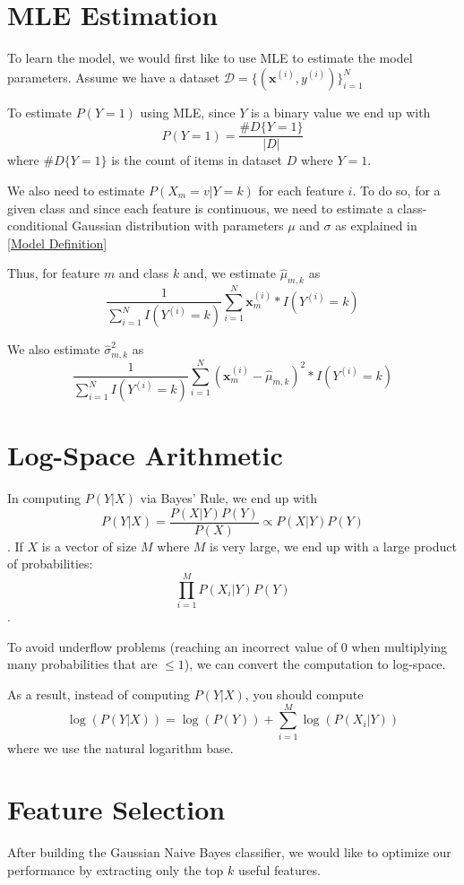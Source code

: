 \documentclass[11pt,addpoints,answers]{exam}
\begin{document}
\section{MLE Estimation}

To learn the model, we would first like to use MLE to estimate the model parameters. Assume we have a dataset $\mathcal{D} = \{(\mathbf{x}^{(i)},y^{(i)})\}_{i=1}^N$

To estimate $P(Y=1)$ using MLE, since $Y$ is a binary value we end up with $$P(Y=1) = \frac{\#D\{Y=1\}}{|D|}$$ where $\#D\{Y=1\}$ is the count of items in dataset $D$ where $Y = 1$. 

We also need to estimate $P(X_m = v| Y = k)$ for each feature $i$. To do so, for a given class and since each feature is continuous, we need to estimate a class-conditional Gaussian distribution with parameters $\mu$ and $\sigma$ as explained in \ref{Model Definition}


Thus, for feature $m$ and class $k$ and, we estimate $\hat{\mu}_{m,k}$ as $$\frac{1}{\sum_{i=1}^{N} I(Y^{(i)} = k)} \sum_{i=1}^{N} \mathbf{x}^{(i)}_m * I (Y^{(i)} = k)$$

We also estimate $\hat{\sigma}_{m,k}^2$ as $$\frac{1}{\sum_{i=1}^{N} I(Y^{(i)} = k)} \sum_{i=1}^{N} (\mathbf{x}^{(i)}_m - \hat{\mu}_{m,k})^2*I (Y^{(i)} = k)$$

\section{Log-Space Arithmetic}

In computing $P(Y|X)$ via Bayes' Rule, we end up with $$P(Y|X) = \frac{P(X|Y)P(Y)}{P(X)} \propto P(X|Y)P(Y)$$. If $X$ is a vector of size $M$ where $M$ is very large, we end up with a large product of probabilities: $$\prod_{i=1}^{M} P(X_i|Y) P(Y)$$.

To avoid underflow problems (reaching an incorrect value of 0 when multiplying many probabilities that are $\leq 1$), we can convert the computation to log-space. 

As a result, instead of computing $P(Y|X)$, you should compute $$\log(P(Y|X)) = \log(P(Y)) + \sum_{i=1}^{M} \log(P(X_i|Y))$$ where we use the natural logarithm base. 

\section{Feature Selection}
\label{features}

After building the Gaussian Naive Bayes classifier, we would like to optimize our performance by extracting only the top $k$ useful features.
\end{document}
